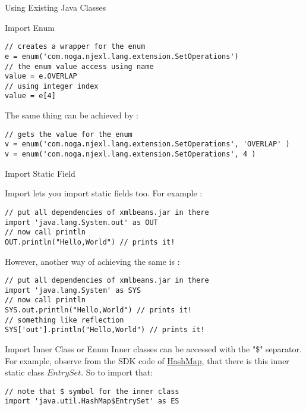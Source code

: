 \begin{section}{Using Existing Java Classes}
\begin{subsection}{Import Enum}
\begin{lstlisting}[style=JexlStyle]
// creates a wrapper for the enum 
e = enum('com.noga.njexl.lang.extension.SetOperations')
// the enum value access using name 
value = e.OVERLAP
// using integer index 
value = e[4] 
\end{lstlisting}

The same thing can be achieved by :

\begin{lstlisting}[style=JexlStyle]
// gets the value for the enum 
v = enum('com.noga.njexl.lang.extension.SetOperations', 'OVERLAP' )
v = enum('com.noga.njexl.lang.extension.SetOperations', 4 )
\end{lstlisting}

\end{subsection}



\begin{subsection}{Import Static Field}

Import lets you import static fields too. For example :

\begin{lstlisting}[style=JexlStyle]
// put all dependencies of xmlbeans.jar in there
import 'java.lang.System.out' as OUT
// now call println 
OUT.println("Hello,World") // prints it!
\end{lstlisting}

However, another way of achieving the same is :

\begin{lstlisting}[style=JexlStyle]
// put all dependencies of xmlbeans.jar in there
import 'java.lang.System' as SYS
// now call println 
SYS.out.println("Hello,World") // prints it!
// something like reflection
SYS['out'].println("Hello,World") // prints it!
\end{lstlisting}

\end{subsection}

\begin{subsection}{Import Inner Class or Enum}
Inner classes can be accessed with the "\$" separator.
For example, observe from the SDK code of 
\href{http://grepcode.com/file/repository.grepcode.com/java/root/jdk/openjdk/8u40-b25/java/util/HashMap.java/}{HashMap},
that there is this inner static class $EntrySet$. So to import that:

\begin{lstlisting}[style=JexlStyle]
// note that $ symbol for the inner class
import 'java.util.HashMap$EntrySet' as ES
\end{lstlisting}

\end{subsection}

\end{section}

